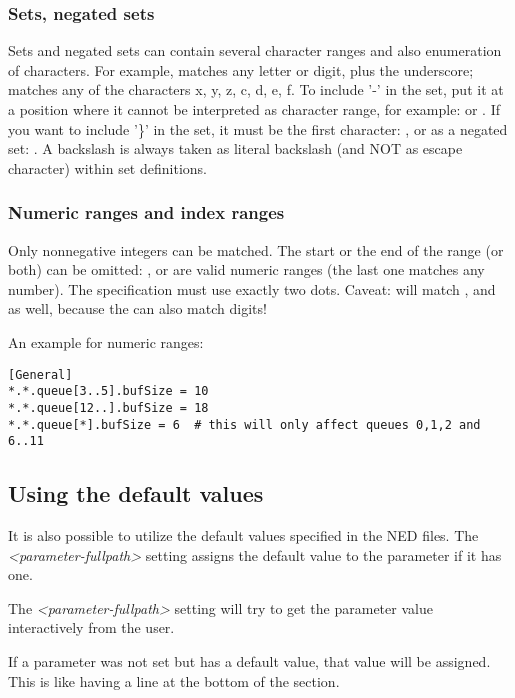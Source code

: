 \subsubsection{Sets, negated sets}

Sets and negated sets can contain several character ranges and also
enumeration of characters. For example,  matches any letter
or digit, plus the underscore;  matches any of the characters
x, y, z, c, d, e, f.
To include '-' in the set, put it at a position where it cannot be
interpreted as character range, for example:  or .
If you want to include '\}' in the set, it must be the first
character: , or as a negated set: . A backslash
is always taken as literal backslash (and NOT as escape character)
within set definitions.


\subsubsection{Numeric ranges and index ranges}

Only nonnegative integers can be matched.  The start or the end of the range
(or both) can be omitted: ,  or 
are valid numeric ranges (the last one matches any number).
The specification must use exactly two dots.
Caveat:  will match ,  and  as well,
because the \ttt{*} can also match digits!

An example for numeric ranges:

\begin{verbatim}
[General]
*.*.queue[3..5].bufSize = 10
*.*.queue[12..].bufSize = 18
*.*.queue[*].bufSize = 6  # this will only affect queues 0,1,2 and 6..11
\end{verbatim}


\subsection{Using the default values}

It is also possible to utilize the default values specified in the NED files.
The \textit{<parameter-fullpath>} setting assigns
the default value to the parameter if it has one.


The \textit{<parameter-fullpath>} setting will try to get the parameter
value interactively from the user.


If a parameter was not set but has a default value, that value will be
assigned. This is like having a  line at the
bottom of the \ttt{[General]} section.


